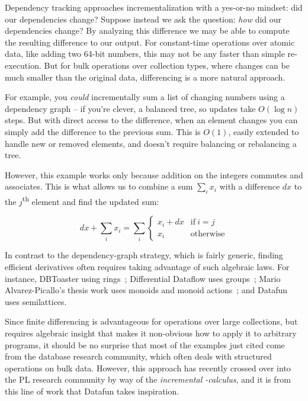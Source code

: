 Dependency tracking approaches incrementalization with a yes-or-no mindset: did
our dependencies change?
%
%
Suppose instead we ask the question: \emph{how} did our dependencies change?
%
By analyzing this difference we may be able to compute the resulting difference
to our output.
%
%
For constant-time operations over atomic data, like adding two 64-bit numbers,
this may not be any faster than simple re-execution.
%
But for bulk operations over collection types, where changes can be much smaller
than the original data, differencing is a more natural approach.

For example, you \emph{could} incrementally sum a list of changing numbers using
a dependency graph -- if you're clever, a balanced tree, so updates take $O(\log
n)$ steps.
%
But with direct access to the difference, when an element changes you can simply
add the difference to the previous sum. This is $O(1)$, easily extended to
handle new or removed elements, and doesn't require balancing or rebalancing a
tree.

However, this example works only because addition on the integers commutes and
associates. This is what allows us to combine a sum $\sum_i x_i$ with a
difference $dx$ to the $j$\textsuperscript{th} element and find the updated sum:

\nopagebreak[2]
\[
dx + \sum_i x_i = \sum_i 
\begin{cases}
  x_i + dx & \text{if}~i = j\\
  x_i & \text{otherwise}
\end{cases}
\]

\noindent
In contrast to the dependency-graph strategy, which is fairly generic, finding
efficient derivatives often requires taking advantage of such algebraic laws.
%
For instance, DBToaster  using rings~\citep{dbtoaster-rings};
Differential Dataflow uses groups~\citep{DBLP:conf/cidr/McSherryMII13}; Mario
Alvarez-Picallo's thesis work  uses monoids and
monoid actions~\citep{mario-picallo-thesis,semmle-changes}; and Datafun uses
semilattices. 

Since finite differencing is advantageous for operations over large collections,
but requires algebraic insight that makes it non-obvious how to apply it to
arbitrary programs, it should be no surprise that most of the examples just
cited come from the database research community, which often deals with
structured operations on bulk data.
%
However, this approach has recently crossed over into the PL research community
by way of the \emph{incremental \fn-calculus}, and it is from this line of work
that Datafun takes inspiration.

